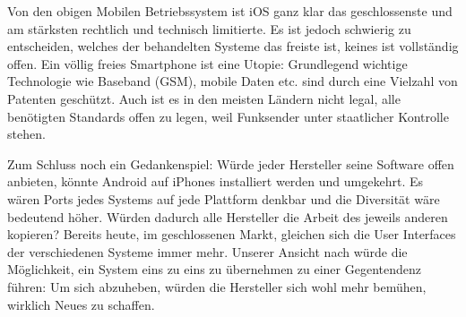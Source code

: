 Von den obigen Mobilen Betriebssystem ist iOS ganz klar das geschlossenste und am stärksten rechtlich und technisch limitierte. Es ist jedoch schwierig zu entscheiden, welches der behandelten Systeme das freiste ist, keines ist vollständig offen. Ein völlig freies Smartphone ist eine Utopie: Grundlegend wichtige Technologie wie Baseband (GSM), mobile Daten etc. sind durch eine Vielzahl von Patenten geschützt. Auch ist es in den meisten Ländern nicht legal, alle benötigten Standards offen zu legen, weil Funksender unter staatlicher Kontrolle stehen.

Zum Schluss noch ein Gedankenspiel: Würde jeder Hersteller seine Software offen anbieten, könnte Android auf iPhones installiert werden und umgekehrt. Es wären Ports jedes Systems auf jede Plattform denkbar und die Diversität wäre bedeutend höher. Würden dadurch alle Hersteller die Arbeit des jeweils anderen kopieren? Bereits heute, im geschlossenen Markt, gleichen sich die User Interfaces der verschiedenen Systeme immer mehr. Unserer Ansicht nach würde die Möglichkeit, ein System eins zu eins zu übernehmen zu einer Gegentendenz führen: Um sich abzuheben, würden die Hersteller sich wohl mehr bemühen, wirklich Neues zu schaffen.